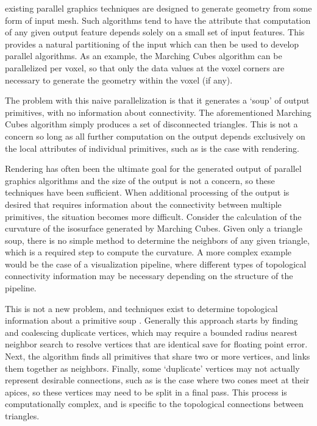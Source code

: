 \documentclass[10pt,journal,cspaper,compsoc]{IEEEtran}
\begin{document}
% 
% 
% 
% 
 existing parallel graphics techniques are designed to generate geometry from
some form of input mesh. Such algorithms tend to have the attribute that
computation of any given output feature depends solely on a small set
of input features. This provides a natural partitioning of the input
which can then be used to develop parallel algorithms. As an example,
the Marching Cubes \cite{Lorensen1987} algorithm can be parallelized per voxel, so that only
the data values at the voxel corners are necessary to generate the geometry
within the voxel (if any).

The problem with this naive parallelization is that it generates a
`soup' of output primitives, with no information about connectivity.
The aforementioned Marching Cubes algorithm simply produces a set of disconnected triangles.
This is not a concern so long as all further computation on the output
depends exclusively on the local attributes of individual primitives, such as is
the case with rendering. 

Rendering has often been the ultimate goal for the
generated output of parallel graphics algorithms and the size of the output is not a concern, so these techniques have been sufficient. When
additional processing of the output is desired that requires information about the connectivity 
between multiple primitives, the situation becomes more difficult. Consider the calculation of 
the curvature of the isosurface generated by Marching Cubes.
Given only a triangle soup, there is no simple method to determine the neighbors of any given triangle, which is a required step to 
compute the curvature. A more complex example would be the case of a visualization pipeline,
where different types of topological connectivity information may be necessary depending
on the structure of the pipeline.

This is not a new problem, and techniques exist to determine topological
information about a primitive soup \cite{Park}. Generally this approach starts by finding 
and coalescing duplicate vertices, which may require a bounded radius nearest neighbor search to 
resolve vertices that are identical save for floating point error. Next, the algorithm finds all primitives that 
share two or more vertices, and links them together as neighbors. Finally,
some `duplicate' vertices may not actually represent desirable connections,
such as is the case where two cones meet at their apices, so these vertices
may need to be split in a final pass. This process is computationally complex, and is
specific to the topological connections between triangles. 
\end{document}
